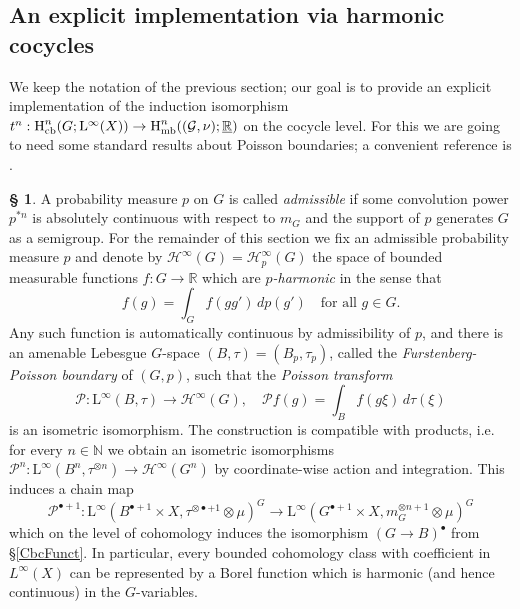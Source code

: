 \documentclass[11pt, oneside]{amsart}
\theoremstyle{definition}
\newtheorem{no}[lemma]{\S}
\theoremstyle{remark}
\theoremstyle{TheoremNum}
\newcommand{\Hmb}{\textup{H}_{\textup{mb}}}
\newcommand{\Hcb}{\textup{H}_{\textup{cb}}}
\newcommand{\Linf}{\mathrm{L}^{\infty}}
\newcommand{\cG}{\mathcal{G}}
\newcommand{\cH}{\mathcal{H}}
\newcommand{\bR}{\mathbb{R}}
\newcommand{\cP}{\mathcal P}
\newcommand{\bN}{\mathbb N}
\begin{document}
 \subsection{An explicit implementation via harmonic cocycles}\label{SecPoisson}
 We keep the notation of the previous section; our goal is to provide an explicit implementation of the induction isomorphism $t^n: \Hcb^n(G; \Linf(X)) \to \Hmb^n((\cG, \nu); \underline{\bR})$ on the cocycle level. For this we are going to need some standard results about Poisson boundaries; a convenient reference is \cite{Furman_RandomWalksOnGroups}.
\begin{no}\label{Poisson1} A probability measure $p$ on $G$ is called \emph{admissible} if some convolution power $p^{\ast n}$ is absolutely continuous with respect to $m_G$ and the support of $p$ generates $G$ as a semigroup. For the remainder of this section we fix an admissible probability measure $p$ and denote by $\cH^\infty(G) = \cH^\infty_p(G)$ the space of bounded measurable functions $f: G \to \bR$ which are \emph{$p$-harmonic} in the sense that 
\[
f(g) = \int_G f(gg')\, dp(g') \quad \text{for all }g\in G.
\]
Any such function is automatically continuous by admissibility of $p$, and there is an amenable Lebesgue $G$-space $(B, \tau) = (B_p, \tau_p)$, called the \emph{Furstenberg-Poisson boundary} of $(G, p)$, such that the \emph{Poisson transform}
\[
\cP: \Linf(B, \tau) \to \cH^\infty(G), \quad \cP f(g) = \int_{B} f(g\xi) \, d\tau(\xi)
\]
is an isometric isomorphism. The construction is compatible with products, i.e. for every $n \in \bN$ we obtain an isometric isomorphisms $\cP^n: \Linf(B^{n}, \tau^{\otimes n}) \to \cH^\infty(G^n)$ by coordinate-wise action and integration. This induces a chain map \[\cP^{\bullet+1}: \Linf(B^{\bullet + 1} \times X, \tau^{\otimes \bullet+1} \otimes \mu)^G \to \Linf(G^{\bullet + 1}\times  X, m_G^{\otimes n+1}\otimes \mu)^G\]
which on the level of cohomology induces the isomorphism $(G \to B)^{\bullet}$ from \S\ref{CbcFunct}. In particular, every bounded cohomology class with coefficient in $L^\infty(X)$ can be represented by a Borel function which is harmonic (and hence continuous) in the $G$-variables.
\end{no}
\end{document}

